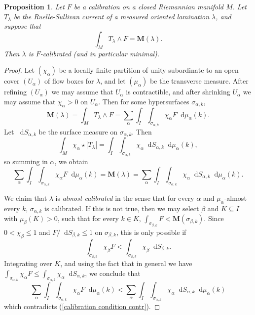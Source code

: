 \documentclass[reqno,11pt]{amsart}
\newcommand*\dif{\mathop{}\!\mathrm{d}}
\newcommand{\Mass}{\mathbf M}
\newcommand{\dfn}[1]{\emph{#1}\index{#1}}
\newtheorem{proposition}[theorem]{Proposition}
\theoremstyle{definition}
\numberwithin{equation}{section}
\begin{document}
\begin{proposition}\label{calibration condition}
Let $F$ be a calibration on a closed Riemannian manifold $M$.
Let $T_\lambda$ be the Ruelle-Sullivan current of a measured oriented lamination $\lambda$, and suppose that 
\begin{equation}\label{calibration by Ruelle Sullivan}
\int_M T_\lambda \wedge F = \Mass(\lambda).
\end{equation}
Then $\lambda$ is $F$-calibrated (and in particular minimal).
\end{proposition}
\begin{proof}
Let $(\chi_\alpha)$ be a locally finite partition of unity subordinate to an open cover $(U_\alpha)$ of flow boxes for $\lambda$, and let $(\mu_\alpha)$ be the transverse measure.
After refining $(U_\alpha)$ we may assume that $U_\alpha$ is contractible, and after shrinking $U_\alpha$ we may assume that $\chi_\alpha > 0$ on $U_\alpha$.
Then for some hypersurfaces $\sigma_{\alpha,k}$,
$$\Mass(\lambda) = \int_M T_\lambda \wedge F = \sum_\alpha \int_I \int_{\sigma_{\alpha,k}} \chi_\alpha F \dif \mu_\alpha(k).$$
Let $\dif S_{\alpha,k}$ be the surface measure on $\sigma_{\alpha,k}$. Then
$$\int_M \chi_\alpha \star |T_\lambda| = \int_I \int_{\sigma_{\alpha,k}} \chi_\alpha \dif S_{\alpha,k} \dif \mu_\alpha(k),$$
so summing in $\alpha$, we obtain 
\begin{equation}\label{calibration condition contr}
\sum_\alpha \int_I \int_{\sigma_{\alpha,k}} \chi_\alpha F \dif \mu_\alpha(k) = \Mass(\lambda) = \sum_\alpha \int_I \int_{\sigma_{\alpha,k}} \chi_\alpha \dif S_{\alpha,k} \dif \mu_\alpha(k).
\end{equation}

We claim that $\lambda$ is \dfn{almost calibrated} in the sense that for every $\alpha$ and $\mu_\alpha$-almost every $k$, $\sigma_{\alpha, k}$ is calibrated.
If this is not true, then we may select $\beta$ and $K \subseteq I$ with $\mu_\beta(K) > 0$, such that for every $k \in K$, $\int_{\sigma_{\beta, k}} F < \Mass(\sigma_{\beta, k})$.
Since $0 < \chi_\beta \leq 1$ and $F/\dif S_{\beta, k} \leq 1$ on $\sigma_{\beta, k}$, this is only possible if 
$$\int_{\sigma_{\beta, k}} \chi_\beta F < \int_{\sigma_{\beta, k}} \chi_\beta \dif S_{\beta, k}.$$
Integrating over $K$, and using the fact that in general we have $\int_{\sigma_{\alpha, k}} \chi_\alpha F \leq \int_{\sigma_{\alpha, k}} \chi_\alpha \dif S_{\alpha, k}$, we conclude that 
$$\sum_\alpha \int_I \int_{\sigma_{\alpha, k}} \chi_\alpha F \dif \mu_\alpha(k) < \sum_\alpha \int_I \int_{\sigma_{\alpha, k}} \chi_\alpha \dif S_{\alpha, k} \dif \mu_\alpha(k)$$
which contradicts (\ref{calibration condition contr}).


\end{proof}
\end{document}
